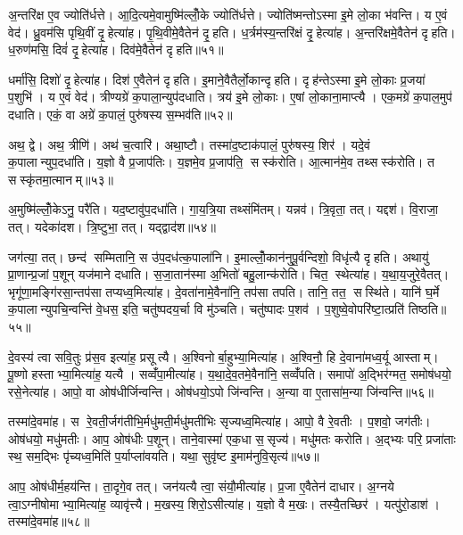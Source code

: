 अ॒न्तरि॑क्ष ए॒व ज्योति॑र्धत्ते। आ॒दि॒त्यमे॒वामुष्मि॑ल्लोँ॒के ज्योति॑र्धत्ते। ज्योति॑ष्मन्तोऽस्मा इ॒मे लो॒का भ॑वन्ति। य ए॒वं वेद॑। ध्रु॒वम॑सि पृथि॒वीं दृ॒हेत्या॑ह। पृ॒थि॒वीमे॒वैतेन॑ दृ॒हति। ध॒र्त्रम॑स्य॒न्तरि॑क्षं दृ॒हेत्या॑ह। अ॒न्तरि॑क्षमे॒वैतेन॑ दृहति। ध॒रुण॑मसि॒ दिवं॑ दृ॒हेत्या॑ह। दिव॑मे॒वैतेन॑ दृहति॥५१॥

धर्मा॑सि॒ दिशो॑ दृ॒हेत्या॑ह। दिश॑ ए॒वैतेन॑ दृहति। इ॒माने॒वैतैर्लो॒कान्दृहति। दृह॑न्तेऽस्मा इ॒मे लो॒काः प्र॒जया॑ प॒शुभि॑। य ए॒वं वेद॑। त्रीण्यग्रे॑ क॒पाला॒न्युप॑दधाति। त्रय॑ इ॒मे लो॒काः। ए॒षां लो॒काना॒माप्त्यै। एक॒मग्रे॑ क॒पाल॒मुप॑ दधाति। एकं॒ वा अग्रे॑ क॒पालं॒ पुरु॑षस्य स॒म्भव॑ति॥५२॥

अथ॒ द्वे। अथ॒ त्रीणि॑। अथ॑ च॒त्वारि॑। अथा॒ष्टौ। तस्मा॑द॒ष्टाक॑पालं॒ पुरु॑षस्य॒ शिर॑। यदे॒वं क॒पालान्युप॒दधा॑ति। य॒ज्ञो वै प्र॒जाप॑तिः। य॒ज्ञमे॒व प्र॒जाप॑ति॒ सस्क॑रोति। आ॒त्मान॑मे॒व तथ्सस्क॑रोति। त सस्कृ॑तमा॒त्मानम्॥५३॥

अ॒मुष्मि॑ल्लोँ॒केऽनु॒ परै॑ति। यद॒ष्टावु॑प॒दधा॑ति। गा॒य॒त्रि॒या तथ्संमि॑तम्। यन्नव॑। त्रि॒वृता॒ तत्। यद्दश॑। वि॒राजा॒ तत्। यदेका॑दश। त्रि॒ष्टुभा॒ तत्। यद्द्वाद॑श॥५४॥

जग॑त्या॒ तत्। छन्द॑ सम्मितानि॒ स उ॑प॒दध॑त्क॒पाला॑नि। इ॒माल्लोँ॒कान॑नुपू॒र्वन्दिशो॒ विधृ॑त्यै दृहति। अथायु॑ प्रा॒णान्प्र॒जां प॒शून् यज॑माने दधाति। स॒जा॒तान॑स्मा अ॒भितो॑ बहु॒लान्क॑रोति। चित॒ स्थेत्या॑ह। य॒था॒य॒जुरे॒वैतत्। भृगू॑णा॒मङ्गि॑रसा॒न्तप॑सा तप्यध्व॒मित्या॑ह। दे॒वता॑नामे॒वैना॑नि॒ तप॑सा तपति। तानि॒ तत॒ सस्थि॑ते। यानि॑ घ॒र्मे क॒पालान्युपचि॒न्वन्ति॑ वे॒धस॒ इति॒ चतु॑ष्पदय॒र्चा वि मु॑ञ्चति। चतु॑ष्पादः प॒शव॑। प॒शुष्वे॒वोपरि॑ष्टा॒त्प्रति॑ तिष्ठति॥५५॥\anuvakamend[व॒र्त॒य॒ति॒ दिव॑मे॒वैतेन॑ दृहति स॒म्भव॑ति॒ त सस्कृ॑तमा॒त्मान॒न्द्वाद॑श॒ सस्थि॑ते॒ त्रीणि॑ च]

दे॒वस्य॑ त्वा सवि॒तुः प्र॑स॒व इत्या॑ह॒ प्रसूत्यै। अ॒श्विनोर्बा॒हुभ्या॒मित्या॑ह। अ॒श्विनौ॒ हि दे॒वाना॑मध्व॒र्यू आस्ताम्। पू॒ष्णो हस्ताभ्या॒मित्या॑ह॒ यत्यै। सव्वँ॑पा॒मीत्या॑ह। य॒था॒दे॒व॒तमे॒वैना॑नि॒ सव्वँ॑पति। समापो॑ अ॒द्भिर॑ग्मत॒ समोष॑धयो॒ रसे॒नेत्या॑ह। आपो॒ वा ओष॑धीर्जिन्वन्ति। ओष॑धयो॒ऽपो जि॑न्वन्ति। अ॒न्या वा ए॒तासा॑म॒न्या जि॑न्वन्ति॥५६॥

तस्मा॑दे॒वमा॑ह। स रे॒वती॒र्जग॑तीभि॒र्मधु॑मती॒र्मधु॑मतीभिः सृज्यध्व॒मित्या॑ह। आपो॒ वै रे॒वतीः। प॒शवो॒ जग॑तीः। ओष॑धयो॒ मधु॑मतीः। आप॒ ओष॑धीः प॒शून्। ताने॒वास्मा॑ एक॒धा स॒सृज्य॑। मधु॑मतः करोति। अ॒द्भ्यः परि॒ प्रजा॑ताः स्थ॒ सम॒द्भिः पृ॑च्यध्व॒मिति॑ प॒र्याप्ला॑वयति। यथा॒ सुवृ॑ष्ट इ॒माम॑नुवि॒सृत्य॑॥५७॥

आप॒ ओष॑धीर्म॒हय॑न्ति। ता॒दृगे॒व तत्। जन॑यत्यै त्वा॒ संयौ॒मीत्या॑ह। प्र॒जा ए॒वैतेन॑ दाधार। अ॒ग्नये त्वा॒ऽग्नीषोमाभ्या॒मित्या॑ह॒ व्यावृ॑त्त्यै। म॒खस्य॒ शिरो॒ऽसीत्या॑ह। य॒ज्ञो वै म॒खः। तस्यै॒तच्छिर॑। यत्पु॑रो॒डाश॑। तस्मा॑दे॒वमा॑ह॥५८॥

